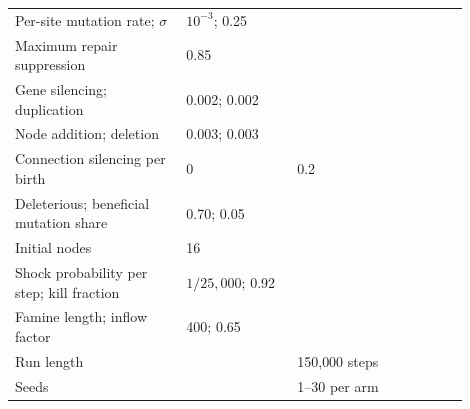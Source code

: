 \begin{longtable}{@{}p{0.34\linewidth}p{0.22\linewidth}p{0.34\linewidth}@{}}
Per-site mutation rate; $\sigma$ & $10^{-3}$; 0.25 & \\
Maximum repair suppression & 0.85 & \\
Gene silencing; duplication & 0.002; 0.002 & \\
Node addition; deletion & 0.003; 0.003 & \\
Connection silencing per birth & 0 & 0.2\\
Deleterious; beneficial mutation share & 0.70; 0.05 & \\
Initial nodes & 16 & \\
Shock probability per step; kill fraction & $1/25{,}000$; 0.92 & \\
Famine length; inflow factor & 400; 0.65 & \\
Run length & & 150{,}000 steps\\
Seeds & & 1--30 per arm\\
\bottomrule
\end{longtable}


